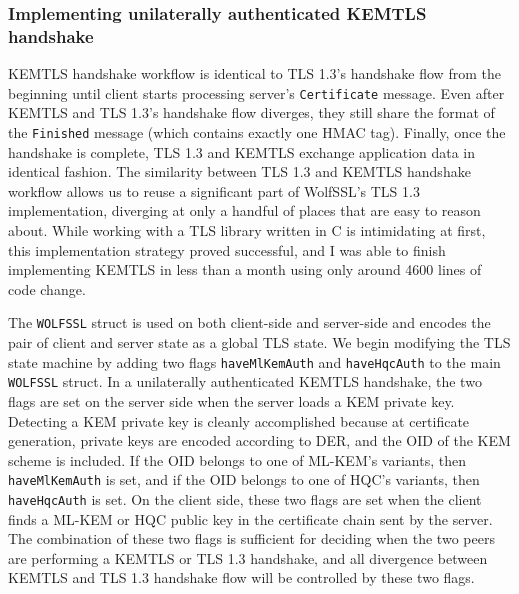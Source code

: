 \documentclass[letterpaper,12pt,titlepage,oneside,final]{book}
\begin{document}
\subsubsection{Implementing unilaterally authenticated KEMTLS handshake}
KEMTLS handshake workflow is identical to TLS 1.3's handshake flow from the beginning until client starts processing server's \texttt{Certificate} message.
Even after KEMTLS and TLS 1.3's handshake flow diverges, they still share the format of the \texttt{Finished} message (which contains exactly one HMAC tag).
Finally, once the handshake is complete, TLS 1.3 and KEMTLS exchange application data in identical fashion.
The similarity between TLS 1.3 and KEMTLS handshake workflow allows us to reuse a significant part of WolfSSL's TLS 1.3 implementation, diverging at only a handful of places that are easy to reason about.
While working with a TLS library written in C is intimidating at first, this implementation strategy proved successful, and I was able to finish implementing KEMTLS in less than a month using only around 4600 lines of code change.

The \texttt{WOLFSSL} struct is used on both client-side and server-side and encodes the pair of client and server state as a global TLS state.
We begin modifying the TLS state machine by adding two flags \texttt{haveMlKemAuth} and \texttt{haveHqcAuth} to the main \texttt{WOLFSSL} struct.
In a unilaterally authenticated KEMTLS handshake, the two flags are set on the server side when the server loads a KEM private key.
Detecting a KEM private key is cleanly accomplished because at certificate generation, private keys are encoded according to DER, and the OID of the KEM scheme is included.
If the OID belongs to one of ML-KEM's variants, then \texttt{haveMlKemAuth} is set, and if the OID belongs to one of HQC's variants, then \texttt{haveHqcAuth} is set.
On the client side, these two flags are set when the client finds a ML-KEM or HQC public key in the certificate chain sent by the server.
The combination of these two flags is sufficient for deciding when the two peers are performing a KEMTLS or TLS 1.3 handshake, and all divergence between KEMTLS and TLS 1.3 handshake flow will be controlled by these two flags.
\end{document}
